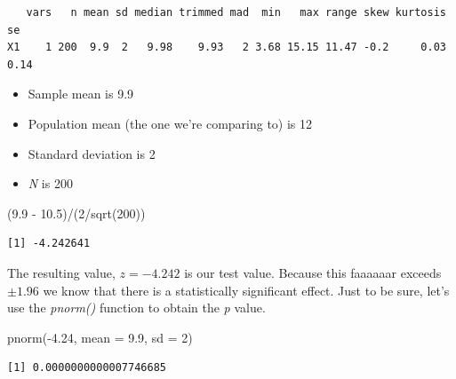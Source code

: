 \documentclass[
  11pt,
]{book}
\newenvironment{Shaded}{\begin{snugshade}}{\end{snugshade}}
\newcommand{\AttributeTok}[1]{\textcolor[rgb]{0.77,0.63,0.00}{#1}}
\newcommand{\DecValTok}[1]{\textcolor[rgb]{0.00,0.00,0.81}{#1}}
\newcommand{\FloatTok}[1]{\textcolor[rgb]{0.00,0.00,0.81}{#1}}
\newcommand{\FunctionTok}[1]{\textcolor[rgb]{0.00,0.00,0.00}{#1}}
\newcommand{\NormalTok}[1]{#1}
\newcommand{\SpecialCharTok}[1]{\textcolor[rgb]{0.00,0.00,0.00}{#1}}
\providecommand{\tightlist}{%
  \setlength{\itemsep}{0pt}\setlength{\parskip}{0pt}}
\begin{document}
\begin{Shaded}
\end{Shaded}

\begin{verbatim}
   vars   n mean sd median trimmed mad  min   max range skew kurtosis   se
X1    1 200  9.9  2   9.98    9.93   2 3.68 15.15 11.47 -0.2     0.03 0.14
\end{verbatim}

\begin{itemize}
\tightlist
\item
  Sample mean is 9.9
\item
  Population mean (the one we're comparing to) is 12
\item
  Standard deviation is 2
\item
  \emph{N} is 200
\end{itemize}

\begin{Shaded}
\begin{Highlighting}[]
\NormalTok{(}\FloatTok{9.9} \SpecialCharTok{{-}} \FloatTok{10.5}\NormalTok{)}\SpecialCharTok{/}\NormalTok{(}\DecValTok{2}\SpecialCharTok{/}\FunctionTok{sqrt}\NormalTok{(}\DecValTok{200}\NormalTok{))}
\end{Highlighting}
\end{Shaded}

\begin{verbatim}
[1] -4.242641
\end{verbatim}

The resulting value, \(z = -4.242\) is our test value. Because this faaaaaar exceeds \(\pm 1.96\) we know that there is a statistically significant effect. Just to be sure, let's use the \emph{pnorm()} function to obtain the \emph{p} value.

\begin{Shaded}
\begin{Highlighting}[]
\FunctionTok{pnorm}\NormalTok{(}\SpecialCharTok{{-}}\FloatTok{4.24}\NormalTok{, }\AttributeTok{mean =} \FloatTok{9.9}\NormalTok{, }\AttributeTok{sd =} \DecValTok{2}\NormalTok{)}
\end{Highlighting}
\end{Shaded}

\begin{verbatim}
[1] 0.0000000000007746685
\end{verbatim}
\end{document}
